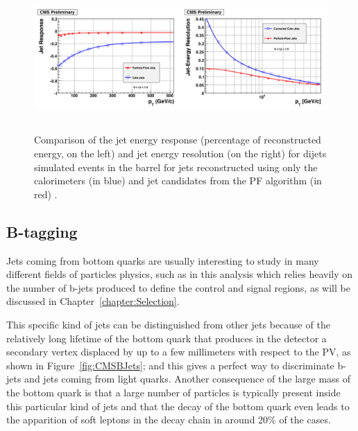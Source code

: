 \documentclass[a4paper, 10pt, openright]{report}
\begin{document}
\begin{figure}[htbp]
\begin{center}
\includegraphics[width=15cm, height=5.5cm]{figs/PFSimu.png}
\caption{Comparison of the jet energy response (percentage of reconstructed energy, on the left) and jet energy resolution (on the right) for dijets simulated events in the barrel for jets reconstructed using only the calorimeters (in blue) and jet candidates from the \ac{PF} algorithm (in red) \cite{PF2}.}
\label{fig:PFSimu}
\end{center}
\end{figure}

\subsection{B-tagging}  \label{section:BTag}

Jets coming from bottom quarks are usually interesting to study in many different fields of particles physics, such as in this analysis which relies heavily on the number of b-jets produced to define the control and signal regions, as will be discussed in Chapter~\ref{chapter:Selection}. 

This specific kind of jets can be distinguished from other jets because of the relatively long lifetime of the bottom quark that produces in the detector a secondary vertex displaced by up to a few millimeters with respect to the \ac{PV}, as shown in Figure~\ref{fig:CMSBJets}; and this gives a perfect way to discriminate b-jets and jets coming from light quarks. Another consequence of the large mass of the bottom quark is that a large number of particles is typically present inside this particular kind of jets and that the decay of the bottom quark even leads to the apparition of soft leptons in the decay chain in around 20\% of the cases.
\end{document}
